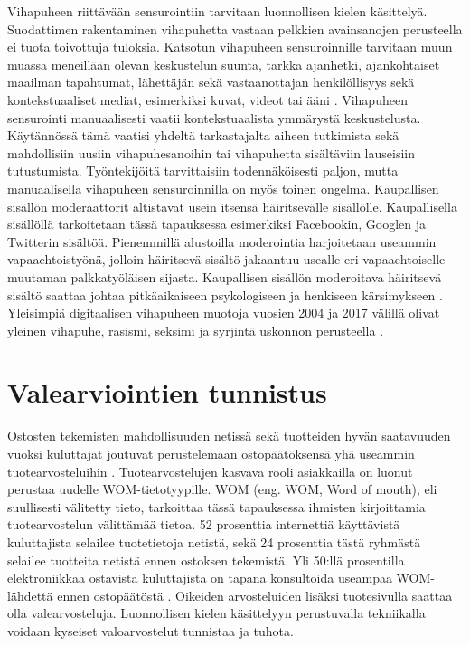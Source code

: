 Vihapuheen riittävään sensurointiin tarvitaan luonnollisen kielen käsittelyä. Suodattimen rakentaminen vihapuhetta vastaan pelkkien avainsanojen perusteella ei tuota toivottuja tuloksia. Katsotun vihapuheen sensuroinnille tarvitaan muun muassa meneillään olevan keskustelun suunta, tarkka ajanhetki, ajankohtaiset maailman tapahtumat, lähettäjän sekä vastaanottajan henkilöllisyys sekä kontekstuaaliset mediat, esimerkiksi kuvat, videot tai ääni \citep{hate}. Vihapuheen sensurointi manuaalisesti vaatii kontekstuaalista ymmärystä keskustelusta. Käytännössä tämä vaatisi yhdeltä tarkastajalta aiheen tutkimista sekä mahdollisiin uusiin vihapuhesanoihin tai vihapuhetta sisältäviin lauseisiin tutustumista. Työntekijöitä tarvittaisiin todennäköisesti paljon, mutta manuaalisella vihapuheen sensuroinnilla on myös toinen ongelma. Kaupallisen sisällön moderaattorit altistavat usein itsensä häiritsevälle sisällölle. Kaupallisella sisällöllä tarkoitetaan tässä tapauksessa esimerkiksi Facebookin, Googlen ja Twitterin sisältöä. Pienemmillä alustoilla moderointia harjoitetaan useammin vapaaehtoistyönä, jolloin häiritsevä sisältö jakaantuu usealle eri vapaaehtoiselle muutaman palkkatyöläisen sijasta. Kaupallisen sisällön moderoitava häiritsevä sisältö saattaa johtaa pitkäaikaiseen psykologiseen ja henkiseen kärsimykseen \citep{moderation}. Yleisimpiä digitaalisen vihapuheen muotoja vuosien 2004 ja 2017 välillä olivat yleinen vihapuhe, rasismi, seksimi ja syrjintä uskonnon perusteella \citep{hatespeech-stats}.

\section{Valearviointien tunnistus}
Ostosten tekemisten mahdollisuuden netissä sekä tuotteiden hyvän saatavuuden vuoksi kuluttajat joutuvat perustelemaan ostopäätöksensä yhä useammin tuotearvosteluihin \citep{falsereview}. Tuotearvostelujen kasvava rooli asiakkailla on luonut perustaa uudelle WOM-tietotyypille. WOM (eng. WOM, Word of mouth), eli suullisesti välitetty tieto, tarkoittaa tässä tapauksessa ihmisten kirjoittamia tuotearvostelun välittämää tietoa. 52 prosenttia internettiä käyttävistä kuluttajista selailee tuotetietoja netistä, sekä 24 prosenttia tästä ryhmästä selailee tuotteita netistä ennen ostoksen tekemistä. Yli 50:llä prosentilla elektroniikkaa ostavista kuluttajista on tapana konsultoida useampaa WOM-lähdettä ennen ostopäätöstä \citep{fakereview-stats}. Oikeiden arvosteluiden lisäksi tuotesivulla saattaa olla valearvosteluja. Luonnollisen kielen käsittelyyn perustuvalla tekniikalla voidaan kyseiset valoarvostelut tunnistaa ja tuhota.

